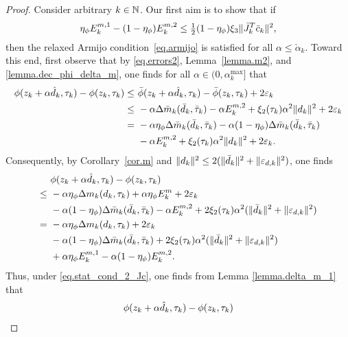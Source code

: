 \begin{proof}
  Consider arbitrary $k \in \mathbb{N}$.  Our first aim is to show that if
  \begin{equation}\label{eq.stat_cond_2_Jc}
    \eta_\phi E_k^{m, 1} -(1 - \eta_\phi) E_k^{m, 2} \leq \tfrac{1}{2} (1 - \eta_\phi) \xi_3 \|{\bar J}_k^T {\bar c}_k\|^2,
  \end{equation}
  then the relaxed Armijo condition~\eqref{eq.armijo} is satisfied for all $\alpha \leq \check \alpha_k$.  Toward this end, first observe that by \eqref{eq.errors2}, Lemma~\ref{lemma.m2}, and \ref{lemma.dec_phi_delta_m}, one finds for all $\alpha \in (0, \alpha_k^{\max}]$ that
  \begin{align*}
    \phi(z_k + \alpha {\hat d}_k, \tau_k) -  \phi(z_k, \tau_k)
      \leq&\ {\bar \phi}(z_k + \alpha {\hat d}_k, \tau_k) - {\bar \phi}(z_k, \tau_k) + 2 \varepsilon_k \\
      \leq&\ - \alpha \Delta {\bar m}_k({\bar d}_k, {\bar \tau}_k) - \alpha E_k^{m, 2} + \xi_2(\tau_k) \alpha^2 \|d_k\|^2 + 2 \varepsilon_k \\ 
      =&\ - \alpha \eta_{\phi} \Delta {\bar m}_k({\bar d}_k, {\bar \tau}_k) - \alpha (1 - \eta_{\phi}) \Delta {\bar m}_k({\bar d}_k, {\bar \tau}_k) \\
      &\ - \alpha E_k^{m, 2} + \xi_2(\tau_k) \alpha^2 \|d_k\|^2 + 2 \varepsilon_k.
    \end{align*}
    Consequently, by Corollary~\ref{cor.m} and $\|d_k\|^2 \leq 2 (\|{\bar d}_k\|^2 + \|\varepsilon_{d,k}\|^2)$, one finds 
    \begin{align*}
      &\ \phi(z_k + \alpha {\hat d}_k, \tau_k) - \phi(z_k, \tau_k) \\
      \leq&\ - \alpha \eta_{\phi} \Delta m_k(d_k, \tau_k) + \alpha \eta_{\phi} E_k^m + 2 \varepsilon_k \\
      &\ - \alpha (1 - \eta_{\phi}) \Delta {\bar m}_k({\bar d}_k, {\bar \tau}_k) - \alpha E_k^{m, 2} + 2 \xi_2(\tau_k) \alpha^2 (\|{\bar d}_k\|^2 + \|\varepsilon_{d,k}\|^2) \\
      =&\ - \alpha \eta_{\phi} \Delta m_k(d_k, \tau_k)+ 2 \varepsilon_k \\
      &\ - \alpha (1 - \eta_{\phi}) \Delta {\bar m}_k({\bar d}_k, {\bar \tau}_k) +  2 \xi_2(\tau_k) \alpha^2 (\|{\bar d}_k\|^2 + \|\varepsilon_{d,k}\|^2) \\
      &\ + \alpha \eta_{\phi} E_k^{m, 1} - \alpha (1 - \eta_{\phi}) E_k^{m, 2}.
    \end{align*}
    Thus, under \eqref{eq.stat_cond_2_Jc}, one finds from Lemma \ref{lemma.delta_m_1} that
    \begin{align*}
      \phi(z_k + \alpha \dhat_k, \tau_k) -  \phi(z_k, \tau_k)

\end{align*}
\end{proof}
